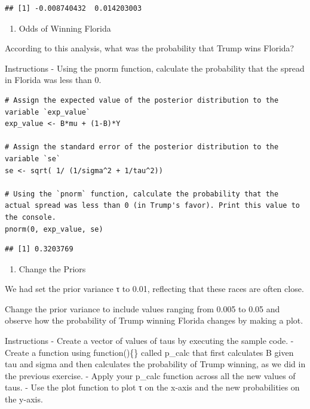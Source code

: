\documentclass[
]{article}
\providecommand{\tightlist}{%
  \setlength{\itemsep}{0pt}\setlength{\parskip}{0pt}}
\begin{document}
\begin{verbatim}
## [1] -0.008740432  0.014203003
\end{verbatim}

\begin{enumerate}
\def\labelenumi{\arabic{enumi}.}
\setcounter{enumi}{10}
\tightlist
\item
  Odds of Winning Florida
\end{enumerate}

According to this analysis, what was the probability that Trump wins
Florida?

Instructions - Using the pnorm function, calculate the probability that
the spread in Florida was less than 0.

\begin{verbatim}
# Assign the expected value of the posterior distribution to the variable `exp_value`
exp_value <- B*mu + (1-B)*Y 

# Assign the standard error of the posterior distribution to the variable `se`
se <- sqrt( 1/ (1/sigma^2 + 1/tau^2))

# Using the `pnorm` function, calculate the probability that the actual spread was less than 0 (in Trump's favor). Print this value to the console.
pnorm(0, exp_value, se)
\end{verbatim}

\begin{verbatim}
## [1] 0.3203769
\end{verbatim}

\begin{enumerate}
\def\labelenumi{\arabic{enumi}.}
\setcounter{enumi}{11}
\tightlist
\item
  Change the Priors
\end{enumerate}

We had set the prior variance τ to 0.01, reflecting that these races are
often close.

Change the prior variance to include values ranging from 0.005 to 0.05
and observe how the probability of Trump winning Florida changes by
making a plot.

Instructions - Create a vector of values of taus by executing the sample
code. - Create a function using function()\{\} called p\_calc that first
calculates B given tau and sigma and then calculates the probability of
Trump winning, as we did in the previous exercise. - Apply your p\_calc
function across all the new values of taus. - Use the plot function to
plot τ on the x-axis and the new probabilities on the y-axis.
\end{document}
